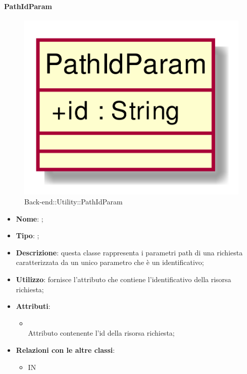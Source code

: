 \hypertarget{PathIdParam_label}{\paragraph{PathIdParam}}
\begin{figure}[h]
	\centering
	\includegraphics[width=\textwidth,height=\textheight,keepaspectratio]{images/ClassPathIdParam.png}
	\caption{Back-end::Utility::PathIdParam}
\end{figure}
\begin{itemize}
	\item \textbf{Nome}: ;
	\item \textbf{Tipo}: ;
	\item \textbf{Descrizione}: questa classe rappresenta i parametri path di una richiesta caratterizzata da un unico parametro che è un identificativo;
	\item \textbf{Utilizzo}: fornisce l'attributo che contiene l'identificativo della risorsa richiesta;
	\item \textbf{Attributi}:
	\begin{itemize}
		\item[]  \\
		Attributo contenente l'id della risorsa richiesta;
	\end{itemize}
	\item \textbf{Relazioni con le altre classi}:
	\begin{itemize}
		\item IN \hyperlink{LambdaIdEvent_label}{}
	\end{itemize}
\end{itemize}
\FloatBarrier


